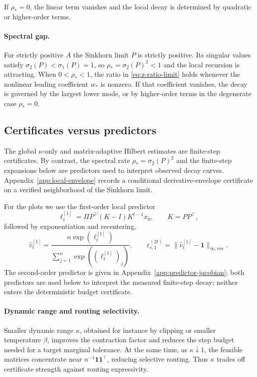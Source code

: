 \documentclass[10pt]{article}
\numberwithin{equation}{section}
\theoremstyle{plain}
\theoremstyle{definition}
\theoremstyle{remark}
\newcommand{\ones}{\mathbf{1}}
\begin{document}
If \(\rho_*=0\), the linear term vanishes and the local decay is determined by
quadratic or higher-order terms.

\paragraph{Spectral gap.}
For strictly positive $A$ the Sinkhorn limit $P$ is strictly positive. Its
singular values satisfy $\sigma_2(P)<\sigma_1(P)=1$, so
$\rho_*=\sigma_2(P)^2<1$ and the local recursion is attracting. When
$0<\rho_*<1$, the ratio in \eqref{eq:z-ratio-limit} holds whenever the nonlinear
leading coefficient $w_*$ is nonzero. If that coefficient vanishes, the decay is
governed by the largest lower mode, or by higher-order terms in the degenerate
case $\rho_*=0$.


\subsection{Certificates versus predictors}
\label{subsec:certificates-versus-predictors}

The global \(\kappa\)-only and matrix-adaptive Hilbert estimates are
finite-step certificates. By contrast, the spectral rate
\(\rho_*=\sigma_2(P)^2\) and the finite-step expansions below are predictors used
to interpret observed decay curves. Appendix~\ref{app:local-envelope} records a
conditional derivative-envelope certificate on a verified neighborhood of the
Sinkhorn limit.

For the plots we use the first-order local predictor
\begin{equation}\label{eq:local-spectral-predictor}
        \ell_t^{[1]}
        =
        \Pi P^\top(K-I)K^{t-1}x_0,
        \qquad
        K=PP^\top,
\end{equation}
followed by exponentiation and recentering,
\begin{equation}\label{eq:local-spectral-predicted-error}
        \widehat v_t^{[1]}
        =
        \frac{n\exp(\ell_t^{[1]})}{\sum_{j=1}^n \exp((\ell_t^{[1]})_j)},
        \qquad
        \widehat\varepsilon_{c,1}^{(2t)}
        =
        \|\widehat v_t^{[1]}-\ones\|_{\infty,\mathrm{vec}}.
\end{equation}
The second-order predictor is given in Appendix~\ref{app:predictor-jacobian};
both predictors are used below to interpret the measured finite-step decay;
neither enters the deterministic budget certificate.

\paragraph{Dynamic range and routing selectivity.}
Smaller dynamic range \(\kappa\), obtained for instance by clipping or smaller
temperature \(\beta\), improves the contraction factor and reduces the step
budget needed for a target marginal tolerance. At the same time, as
\(\kappa\downarrow1\), the feasible matrices concentrate near
\(n^{-1}\ones\ones^\top\), reducing selective routing. Thus \(\kappa\) trades
off certificate strength against routing expressivity.
\end{document}
